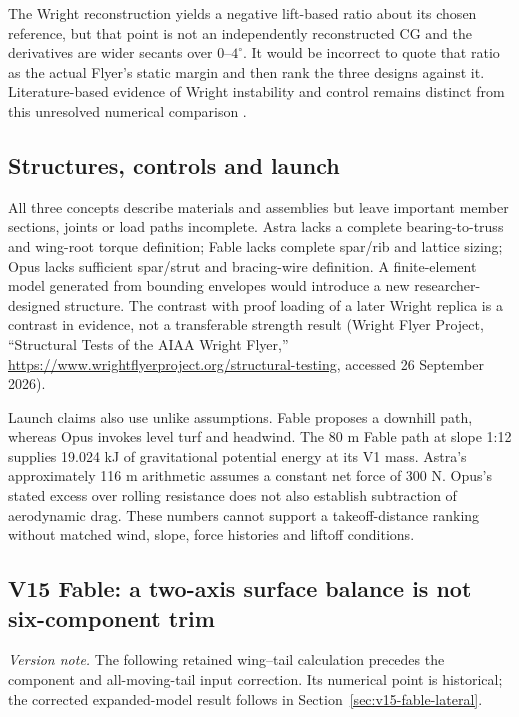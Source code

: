 \documentclass[10pt,letterpaper]{article}
\begin{document}
The Wright reconstruction yields a negative lift-based ratio about its chosen reference, but that point is not an independently reconstructed CG and the derivatives are wider secants over $0$--$4^\circ$. It would be incorrect to quote that ratio as the actual Flyer's static margin and then rank the three designs against it. Literature-based evidence of Wright instability and control remains distinct from this unresolved numerical comparison \cite{ref6,ref10}.

\subsection{Structures, controls and launch}
All three concepts describe materials and assemblies but leave important member sections, joints or load paths incomplete. Astra lacks a complete bearing-to-truss and wing-root torque definition; Fable lacks complete spar/rib and lattice sizing; Opus lacks sufficient spar/strut and bracing-wire definition. A finite-element model generated from bounding envelopes would introduce a new researcher-designed structure. The contrast with proof loading of a later Wright replica is a contrast in evidence, not a transferable strength result (Wright Flyer Project, ``Structural Tests of the AIAA Wright Flyer,'' \url{https://www.wrightflyerproject.org/structural-testing}, accessed 26 September 2026).

Launch claims also use unlike assumptions. Fable proposes a downhill path, whereas Opus invokes level turf and headwind. The 80 m Fable path at slope 1:12 supplies 19.024 kJ of gravitational potential energy at its V1 mass. Astra's approximately 116 m arithmetic assumes a constant net force of 300 N. Opus's stated excess over rolling resistance does not also establish subtraction of aerodynamic drag. These numbers cannot support a takeoff-distance ranking without matched wind, slope, force histories and liftoff conditions.

\subsection{V15 Fable: a two-axis surface balance is not six-component trim}
\noindent\textit{Version note.} The following retained wing--tail calculation precedes the component and all-moving-tail input correction. Its numerical point is historical; the corrected expanded-model result follows in Section~\ref{sec:v15-fable-lateral}.

\label{sec:v15-fable-gate}
\end{document}
